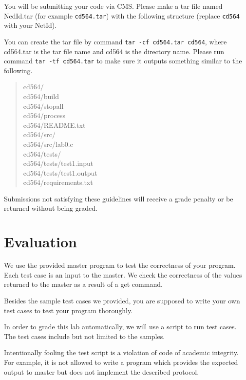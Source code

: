\documentclass[11pt]{article}
\begin{document}
	You will be submitting your code via CMS. Please make a tar file named NedId.tar (for example \texttt{cd564.tar}) with the following structure (replace \texttt{cd564} with your NetId).
	
	
	You can create the tar file by command \texttt{tar -cf cd564.tar cd564}, where cd564.tar is the tar file name and cd564 is the directory name.	Please run command \texttt{tar -tf cd564.tar} to make sure it outputs something similar to the following.
	
	\begin{quote}
		cd564/\\
		cd564/build\\
		cd564/stopall\\
		cd564/process\\
		cd564/README.txt\\
		cd564/src/\\
		cd564/src/lab0.c\\
		cd564/tests/\\
		cd564/tests/test1.input\\
		cd564/tests/test1.output\\
		cd564/requirements.txt\\
	\end{quote}
	
	
	Submissions not satisfying these guidelines will receive a grade penalty or be returned without being graded.
	
	\section{Evaluation}
	\begin{compactitem}
		\item We use the provided master program to test the correctness of	your program. Each test case is an input to the master.  We check the correctness of the values returned to the master as a result of a get command.
		\item Besides the sample test cases we provided, you are supposed to write your own test cases to test your program thoroughly.
		\item In order to grade this lab automatically, we will use a script to run test cases. The test cases include but not limited to the samples.
		\item Intentionally fooling the test script is a violation of code of academic integrity. For example, it is not allowed to write a program which provides the expected output to master but does not implement the described protocol.
	\end{compactitem}
	
\end{document}
